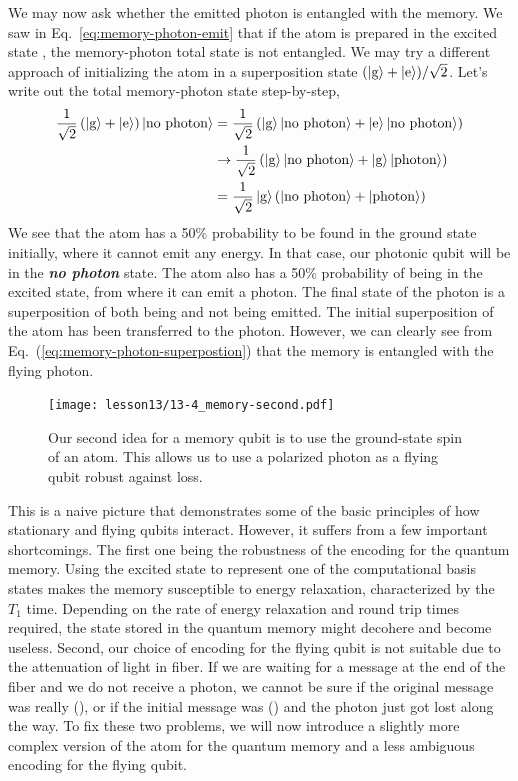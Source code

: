 We may now ask whether the emitted photon is entangled with the memory.
We saw in Eq.~\ref{eq:memory-photon-emit} that if the atom is prepared in the excited state , the memory-photon total state is not entangled.
We may try a different approach of initializing the atom in a superposition state $(\left| \textrm{g} \right\rangle+\left| \textrm{e} \right\rangle)/\sqrt{2}$.
Let's write out the total memory-photon state step-by-step,
\begin{align}
    \frac{1}{\sqrt{2}}\left( \left| \textrm{g} \right\rangle+\left| \textrm{e} \right\rangle \right) \left| \textrm{no photon} \right\rangle & = \frac{1}{\sqrt{2}} \left( \left| \textrm{g} \right\rangle\left| \textrm{no photon} \right\rangle + \left| \textrm{e} \right\rangle\left| \textrm{no photon} \right\rangle \right) \nonumber\\
    & \rightarrow \frac{1}{\sqrt{2}} \left( \left| \textrm{g} \right\rangle\left| \textrm{no photon} \right\rangle + \left| \textrm{g} \right\rangle\left| \textrm{photon} \right\rangle \right) \nonumber\\
    & = \frac{1}{\sqrt{2}} \left| \textrm{g} \right\rangle \left( \left| \textrm{no photon} \right\rangle + \left| \textrm{photon} \right\rangle \right)
    \label{eq:memory-photon-superpostion}
\end{align}
We see that the atom has a 50\% probability to be found in the ground state initially, where it cannot emit any energy.
In that case, our photonic qubit will be in the \textbf{\emph{no photon}} state.
The atom also has a 50\% probability of being in the excited state, from where it can emit a photon.
The final state of the photon is a superposition of both being and not being emitted.
The initial superposition of the atom has been transferred to the photon.
However, we can clearly see from Eq.~(\ref{eq:memory-photon-superpostion}) that the memory is entangled with the flying photon.

\begin{figure}[t]
    \centering
    \texttt{[image: lesson13/13-4\_memory-second.pdf]}
    \caption[Our second idea for memory.]{Our second idea for a memory qubit is to use the ground-state spin of an atom. This allows us to use a polarized photon as a flying qubit robust against loss.}
    \label{fig:13-memory-second-idea}
\end{figure}

This is a naive picture that demonstrates some of the basic principles of how stationary and flying qubits interact.
However, it suffers from a few important shortcomings.
The first one being the robustness of the encoding for the quantum memory.
Using the excited state  to represent one of the computational basis states makes the memory susceptible to energy relaxation, characterized by the $T_1$ time.
Depending on the rate of energy relaxation and round trip times required, the state stored in the quantum memory might decohere and become useless.
Second, our choice of encoding for the flying qubit is not suitable due to the attenuation of light in fiber. 
If we are waiting for a message at the end of the fiber and we do not receive a photon, we cannot be sure if the original message was really  (), or if the initial message was  () and the photon just got lost along the way.
To fix these two problems, we will now introduce a slightly more complex version of the atom for the quantum memory and a less ambiguous encoding for the flying qubit.

